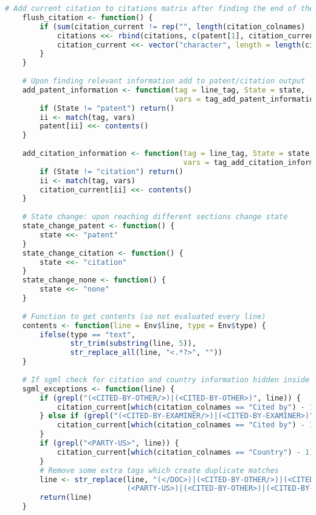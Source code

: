 \begin{lstlisting}[language=R]
    # Add current citation to citations matrix after finding the end of the current citaiton
    flush_citation <- function() {
        if (sum(citation_current != rep("", length(citation_colnames) - 1)) > 0) {
            citations <<- rbind(citations, c(patent[1], citation_current))
            citation_current <<- vector("character", length = length(citation_colnames) - 1)
        }
    }
    
    # Upon finding relevant information add to patent/citation output
    add_patent_information <- function(tag = line_tag, State = state, 
                                       vars = tag_add_patent_information) {
        if (State != "patent") return()
        ii <- match(tag, vars)
        patent[ii] <<- contents()
    }
    
    add_citation_information <- function(tag = line_tag, State = state, 
                                         vars = tag_add_citation_information) {
        if (State != "citation") return()
        ii <- match(tag, vars)
        citation_current[ii] <<- contents()
    }
    
    # State change: upon reaching different sections change state 
    state_change_patent <- function() {
        state <<- "patent"
    }
    state_change_citation <- function() {
        state <<- "citation"
    }
    state_change_none <- function() {
        state <<- "none"
    }
    
    # Function to get contents (so not evaluated every line) 
    contents <- function(line = Env$line, type = Env$type) {
        ifelse(type == "text",
               str_trim(substring(line, 5)),
               str_replace_all(line, "<.*?>", ""))
    } 
    
    # If sgml check for citation and country information hidden inside the tag
    sgml_exceptions <- function(line) {
        if (grepl("(<CITED-BY-OTHER/>)|(<CITED-BY-OTHER>)", line)) {
            citation_current[which(citation_colnames == "Cited by") - 1] <<- "cited by other"    
        } else if (grepl("(<CITED-BY-EXAMINER/>)|(<CITED-BY-EXAMINER>)", line)){
            citation_current[which(citation_colnames == "Cited by") - 1] <<- "cited by examiner"    
        }
        if (grepl("<PARTY-US>", line)) {
            citation_current[which(citation_colnames == "Country") - 1] <<- "US"
        }
        # Remove some extra tags which create duplicate matches
        line <- str_replace(line, "(</DOC>)|(<CITED-BY-OTHER/>)|(<CITED-BY-EXAMINER/>)|
                            (<PARTY-US>)|(<CITED-BY-OTHER>)|(<CITED-BY-EXAMINER>)", "")
        return(line)
    }
    

\end{lstlisting}
